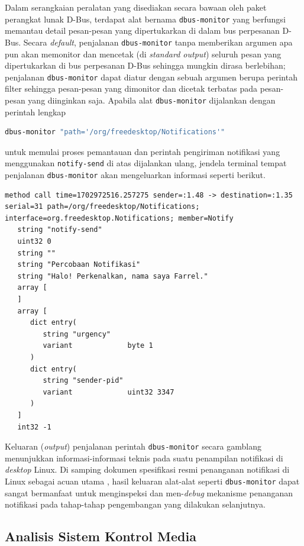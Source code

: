 Dalam serangkaian peralatan yang disediakan secara bawaan oleh paket perangkat lunak D-Bus, terdapat alat bernama \verb|dbus-monitor| yang berfungsi memantau detail pesan-pesan yang dipertukarkan di dalam bus perpesanan D-Bus. Secara \textit{default}, penjalanan \verb|dbus-monitor| tanpa memberikan argumen apa pun akan memonitor dan mencetak (di \textit{standard output}) seluruh pesan yang dipertukarkan di bus perpesanan D-Bus sehingga mungkin dirasa berlebihan; penjalanan \verb|dbus-monitor| dapat diatur dengan sebuah argumen berupa perintah filter sehingga pesan-pesan yang dimonitor dan dicetak terbatas pada pesan-pesan yang diinginkan saja. Apabila alat \verb|dbus-monitor| dijalankan dengan perintah lengkap
\begin{lstlisting}[language=bash]
    dbus-monitor "path='/org/freedesktop/Notifications'"
\end{lstlisting}
untuk memulai proses pemantauan dan perintah pengiriman notifikasi yang menggunakan \verb|notify-send| di atas dijalankan ulang, jendela terminal tempat penjalanan \verb|dbus-monitor| akan mengeluarkan informasi seperti berikut.
\begin{lstlisting}
method call time=1702972516.257275 sender=:1.48 -> destination=:1.35 serial=31 path=/org/freedesktop/Notifications; interface=org.freedesktop.Notifications; member=Notify
   string "notify-send"
   uint32 0
   string ""
   string "Percobaan Notifikasi"
   string "Halo! Perkenalkan, nama saya Farrel."
   array [
   ]
   array [
      dict entry(
         string "urgency"
         variant             byte 1
      )
      dict entry(
         string "sender-pid"
         variant             uint32 3347
      )
   ]
   int32 -1
\end{lstlisting}

Keluaran (\textit{output}) penjalanan perintah \verb|dbus-monitor| secara gamblang menunjukkan informasi-informasi teknis pada suatu penampilan notifikasi di \textit{desktop} Linux. Di samping dokumen spesifikasi resmi penanganan notifikasi di Linux sebagai acuan utama \cite{xdg-desktop-notifications-specification}, hasil keluaran alat-alat seperti \verb|dbus-monitor| dapat sangat bermanfaat untuk menginspeksi dan men-\textit{debug} mekanisme penanganan notifikasi pada tahap-tahap pengembangan yang dilakukan selanjutnya.

\subsection{Analisis Sistem Kontrol Media}

